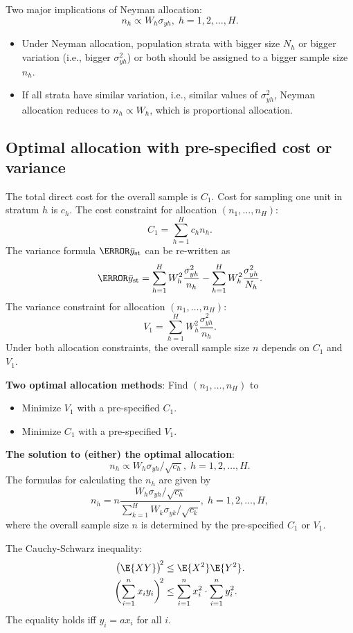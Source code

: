 Two major implications of Neyman allocation:
\[ n_h\propto W_h\sigma_{yh},\; h=1,2,\ldots,H. \]
\begin{itemize}
      \item Under Neyman allocation, population strata with bigger size $ N_h $
            or bigger variation (i.e., bigger $ \sigma_{yh}^2 $) or both should be assigned to
            a bigger sample size $ n_h $.
      \item If all strata have similar variation, i.e., similar values of $ \sigma_{yh}^2 $,
            Neyman allocation reduces to $ n_h\propto W_h $, which is proportional allocation.
\end{itemize}

\subsection{Optimal allocation with pre-specified cost or variance}
The total direct cost for the overall sample is $ C_1 $. Cost for sampling
one unit in stratum $h$ is $ c_h $. The cost constraint for allocation
$ (n_1,\ldots,n_H) $:
\[ C_1=\sum_{h=1}^{H}c_h n_h. \]
The variance formula $ \V{\bar{y}_{\st}} $ can be re-written as
\[ \V{\bar{y}_{\st}}=\sum_{h=1}^{H}W_h^2 \frac{\sigma_{yh}^2}{n_h}-\sum_{h=1}^{H}W_h^2 \frac{\sigma_{yh}^2}{N_h}. \]
The variance constraint for allocation $ (n_1,\ldots,n_H) $:
\[ V_1=\sum_{h=1}^{H}W_h^2 \frac{\sigma_{yh}^2}{n_h}. \]
Under both allocation constraints, the overall sample size $n$ depends
on $C_1$ and $V_1$.

\textbf{Two optimal allocation methods}: Find $ (n_1,\ldots,n_H) $ to
\begin{itemize}
      \item Minimize $ V_1 $ with a pre-specified $ C_1 $.
      \item Minimize $ C_1 $ with a pre-specified $ V_1 $.
\end{itemize}
\textbf{The solution to (either) the optimal allocation}:
\[ n_h\propto W_h \sigma_{yh}/\sqrt{c_h},\; h=1,2,\ldots,H. \]
The formulas for calculating the $ n_h $ are given by
\[ n_h=n \frac{W_h\sigma_{yh}/\sqrt{c_h}}{\sum_{k=1}^{H}W_k \sigma_{yk}/\sqrt{c_k}},\; h=1,2,\ldots,H, \]
where the overall sample size $ n $ is determined by the pre-specified $ C_1 $ or $ V_1 $.

The Cauchy-Schwarz inequality:
\begin{align*}
      \bigl(\E{XY}\bigr)^{\!2}                  & \le \E{X^2}\E{Y^2}.                               \\
      \biggl(\sum_{i=1}^{n}x_i y_i\biggr)^{\!2} & \le \sum_{i=1}^{n}x_i^2\cdot \sum_{i=1}^{n}y_i^2.
\end{align*}
The equality holds iff $ y_i=a x_i $ for all $ i $.

